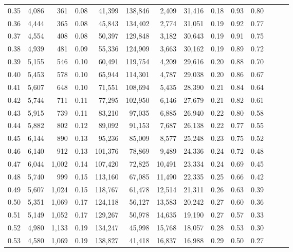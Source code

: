 \begin{tabular}{rrrrrrrrrrrrrr}
0.35 &  4,086 &    361 &  0.08 &   41,399 &  138,846 &   2,409 &  31,416 &  0.18 &  0.93 &      0.80 \\
0.36 &  4,444 &    365 &  0.08 &   45,843 &  134,402 &   2,774 &  31,051 &  0.19 &  0.92 &      0.77 \\
0.37 &  4,554 &    408 &  0.08 &   50,397 &  129,848 &   3,182 &  30,643 &  0.19 &  0.91 &      0.75 \\
0.38 &  4,939 &    481 &  0.09 &   55,336 &  124,909 &   3,663 &  30,162 &  0.19 &  0.89 &      0.72 \\
0.39 &  5,155 &    546 &  0.10 &   60,491 &  119,754 &   4,209 &  29,616 &  0.20 &  0.88 &      0.70 \\
0.40 &  5,453 &    578 &  0.10 &   65,944 &  114,301 &   4,787 &  29,038 &  0.20 &  0.86 &      0.67 \\
0.41 &  5,607 &    648 &  0.10 &   71,551 &  108,694 &   5,435 &  28,390 &  0.21 &  0.84 &      0.64 \\
0.42 &  5,744 &    711 &  0.11 &   77,295 &  102,950 &   6,146 &  27,679 &  0.21 &  0.82 &      0.61 \\
0.43 &  5,915 &    739 &  0.11 &   83,210 &   97,035 &   6,885 &  26,940 &  0.22 &  0.80 &      0.58 \\
0.44 &  5,882 &    802 &  0.12 &   89,092 &   91,153 &   7,687 &  26,138 &  0.22 &  0.77 &      0.55 \\
0.45 &  6,144 &    890 &  0.13 &   95,236 &   85,009 &   8,577 &  25,248 &  0.23 &  0.75 &      0.52 \\
0.46 &  6,140 &    912 &  0.13 &  101,376 &   78,869 &   9,489 &  24,336 &  0.24 &  0.72 &      0.48 \\
0.47 &  6,044 &  1,002 &  0.14 &  107,420 &   72,825 &  10,491 &  23,334 &  0.24 &  0.69 &      0.45 \\
0.48 &  5,740 &    999 &  0.15 &  113,160 &   67,085 &  11,490 &  22,335 &  0.25 &  0.66 &      0.42 \\
0.49 &  5,607 &  1,024 &  0.15 &  118,767 &   61,478 &  12,514 &  21,311 &  0.26 &  0.63 &      0.39 \\
0.50 &  5,351 &  1,069 &  0.17 &  124,118 &   56,127 &  13,583 &  20,242 &  0.27 &  0.60 &      0.36 \\
0.51 &  5,149 &  1,052 &  0.17 &  129,267 &   50,978 &  14,635 &  19,190 &  0.27 &  0.57 &      0.33 \\
0.52 &  4,980 &  1,133 &  0.19 &  134,247 &   45,998 &  15,768 &  18,057 &  0.28 &  0.53 &      0.30 \\
0.53 &  4,580 &  1,069 &  0.19 &  138,827 &   41,418 &  16,837 &  16,988 &  0.29 &  0.50 &      0.27 \\

\end{tabular}
